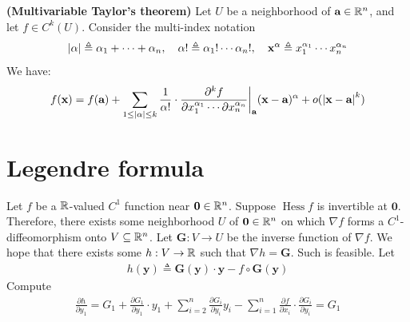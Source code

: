 \documentclass{report}
\begin{document}
\begin{theorem}
\label{THmTt}
\textbf{(Multivariable Taylor's theorem)} Let  $U$ be a neighborhood of $\textbf{a}\in\mathbb{R}^n$, and let $f\in C^k(U)$. Consider the   multi-index notation  
\begin{align*}
  \left|\alpha \right|\triangleq  \alpha_1 + \cdots + \alpha _n,\quad  \alpha ! \triangleq \alpha_1! \cdots \alpha_n!,\quad  \textbf{x}^{\alpha }\triangleq  x_1^{\alpha _1}\cdots x_n^{\alpha _n}   
\end{align*}
We have: 
\begin{align*}
f(\textbf{x})= f(\textbf{a})+\sum_{1\leq \left|\alpha \right|\leq k} \frac{1}{\alpha !}\cdot  \frac{\partial^k f}{\partial x_1^{\alpha _1} \cdots \partial x_n^{\alpha _n}} \bigg|_{\textbf{a}} (\textbf{x}-\textbf{a})^{\alpha } + o( \left|\textbf{x}-\textbf{a}\right|^k)
\end{align*}
\end{theorem}
\section{Legendre formula}
Let $f$ be a $\mathbb{R}$-valued  $C^1$ function near  $\textbf{0}\in\mathbb{R}^n$. Suppose $\operatorname{Hess}f$ is invertible at $\textbf{0}$. Therefore, there exists some neighborhood $U$ of $\textbf{0}\in\mathbb{R}^n$ on which $\nabla f$ forms a $C^1$-diffeomorphism onto $V \subseteq \mathbb{R}^n$. Let $\textbf{G}:V \rightarrow U$ be the inverse function of $\nabla f$. We hope that there exists some $h:V \rightarrow \mathbb{R}$ such that $\nabla h=\textbf{G}$. Such is feasible. Let 
\begin{align*}
h (\textbf{y})\triangleq \textbf{G}(\textbf{y}) \cdot \textbf{y} - f\circ \textbf{G}(\textbf{y})
\end{align*}
Compute 
\begin{align*}
\frac{\partial h}{\partial y_1}= G_1 + \frac{\partial G_1}{\partial y_1} \cdot y_1 + \sum_{i=2}^n \frac{\partial G_i}{\partial y_i} y_i - \sum_{i=1}^n \frac{\partial f}{\partial x_i} \cdot \frac{\partial G_i}{\partial y_i} = G_1
\end{align*}
\end{document}
